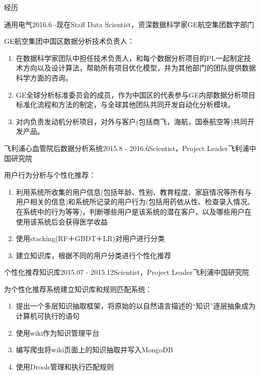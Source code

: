 \documentclass{resume} %
\begin{document}
\vspace{-10pt}
\begin{rSection}{经历}
	\begin{rSubsection}{通用电气}{2016.6 -现在}{Staff Data Scientist，资深数据科学家}{GE航空集团数字部门}
		\item GE航空集团中国区数据分析技术负责人：
		\begin{enumerate}
			\item 在数据科学家团队中担任技术负责人，和每个数据分析项目的PL一起制定技术方向以及设计算法，帮助所有项目优化模型，并为其他部门的团队提供数据科学方面的咨询。
			\item GE全球分析标准委员会的成员，作为中国区的代表参与GE内部数据分析项目标准化流程和方法的制定，与全球其他团队共同开发自动化分析模块。
			\item 对内负责发动机分析项目，对外与客户(包括商飞，海航，国泰航空等)共同开发产品。
		\end{enumerate}
	\end{rSubsection}

\begin{rSubsection}{飞利浦心血管院后数据分析系统}{2015.8 - 2016.6}{Scientist，Project Leader}{飞利浦中国研究院}
\item 用户行为分析与个性化推荐：
\begin{enumerate}
\item 利用系统所收集的用户信息(包括年龄、性别、教育程度、家庭情况等所有与用户相关的信息)和系统所记录的用户行为(包括用药依从性、检查录入情况、在系统中的行为等等)，判断哪些用户是该系统的潜在客户，以及哪些用户在使用该系统后会获得医学收益
\item 使用stacking(RF＋GBDT＋LR)对用户进行分类
\item 建立知识库，根据不同的用户分类进行个性化推荐
\end{enumerate}
\end{rSubsection}

\begin{rSubsection}{个性化推荐知识库}{2015.07 - 2015.12}{Scientist，Project Leader}{飞利浦中国研究院}
\item  为个性化推荐系统建立知识库和规则匹配系统：
\begin{enumerate}
\item 提出一个多层知识抽取框架，将原始的以自然语言描述的“知识”逐层抽象成为计算机可执行的语句 
\item 使用wiki作为知识管理平台
\item 编写爬虫将wiki页面上的知识抽取并写入MongoDB
\item 使用Drools管理和执行匹配规则 
\end{enumerate}
\end{rSubsection}


\end{rSection}
\end{document}
